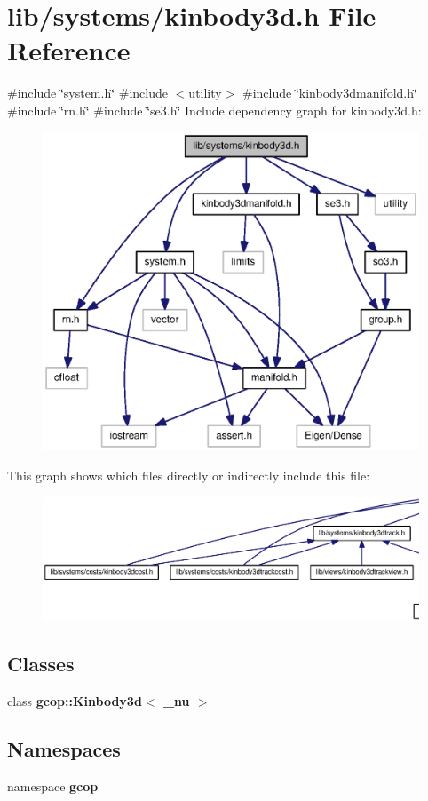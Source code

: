 \section{lib/systems/kinbody3d.h \-File \-Reference}
\label{kinbody3d_8h}
{\ttfamily \#include \char`\"{}system.\-h\char`\"{}}\*
{\ttfamily \#include $<$utility$>$}\*
{\ttfamily \#include \char`\"{}kinbody3dmanifold.\-h\char`\"{}}\*
{\ttfamily \#include \char`\"{}rn.\-h\char`\"{}}\*
{\ttfamily \#include \char`\"{}se3.\-h\char`\"{}}\*
\-Include dependency graph for kinbody3d.\-h\-:\nopagebreak
\begin{figure}[H]
\begin{center}
\leavevmode
\includegraphics[width=350pt]{kinbody3d_8h__incl}
\end{center}
\end{figure}
\-This graph shows which files directly or indirectly include this file\-:
\nopagebreak
\begin{figure}[H]
\begin{center}
\leavevmode
\includegraphics[width=350pt]{kinbody3d_8h__dep__incl}
\end{center}
\end{figure}
\subsection*{\-Classes}
\begin{DoxyCompactItemize}
\item 
class {\bf gcop\-::\-Kinbody3d$<$ \-\_\-nu $>$}
\end{DoxyCompactItemize}
\subsection*{\-Namespaces}
\begin{DoxyCompactItemize}
\item 
namespace {\bf gcop}
\end{DoxyCompactItemize}

